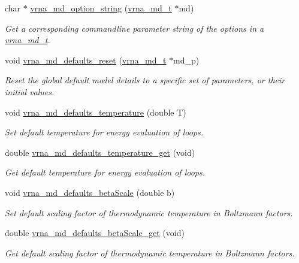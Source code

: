 \begin{DoxyCompactItemize}
char $\ast$ \hyperlink{group__model__details_ga3a7469f0725a849af6ba61a57dfd60ce}{vrna\+\_\+md\+\_\+option\+\_\+string} (\hyperlink{group__model__details_ga1f8a10e12a0a1915f2a4eff0b28ea17c}{vrna\+\_\+md\+\_\+t} $\ast$md)
\begin{DoxyCompactList}\small\item\em Get a corresponding commandline parameter string of the options in a \hyperlink{group__model__details_ga1f8a10e12a0a1915f2a4eff0b28ea17c}{vrna\+\_\+md\+\_\+t}. \end{DoxyCompactList}\item 
void \hyperlink{group__model__details_ga70834424cf804d149937de89f80ceb45}{vrna\+\_\+md\+\_\+defaults\+\_\+reset} (\hyperlink{group__model__details_ga1f8a10e12a0a1915f2a4eff0b28ea17c}{vrna\+\_\+md\+\_\+t} $\ast$md\+\_\+p)
\begin{DoxyCompactList}\small\item\em Reset the global default model details to a specific set of parameters, or their initial values. \end{DoxyCompactList}\item 
void \hyperlink{group__model__details_gaf9e527e9a2f7e6fd6e42bc6e602f5445}{vrna\+\_\+md\+\_\+defaults\+\_\+temperature} (double T)
\begin{DoxyCompactList}\small\item\em Set default temperature for energy evaluation of loops. \end{DoxyCompactList}\item 
double \hyperlink{group__model__details_ga96b24a74437f9ba46c4e06343155bf46}{vrna\+\_\+md\+\_\+defaults\+\_\+temperature\+\_\+get} (void)
\begin{DoxyCompactList}\small\item\em Get default temperature for energy evaluation of loops. \end{DoxyCompactList}\item 
void \hyperlink{group__model__details_gae984567db36c3f9b8731ecc917abf3a2}{vrna\+\_\+md\+\_\+defaults\+\_\+beta\+Scale} (double b)
\begin{DoxyCompactList}\small\item\em Set default scaling factor of thermodynamic temperature in Boltzmann factors. \end{DoxyCompactList}\item 
double \hyperlink{group__model__details_gabb8780f5410c52f970d75b044059bd09}{vrna\+\_\+md\+\_\+defaults\+\_\+beta\+Scale\+\_\+get} (void)
\begin{DoxyCompactList}\small\item\em Get default scaling factor of thermodynamic temperature in Boltzmann factors. \end{DoxyCompactList}\item 

\end{DoxyCompactItemize}
